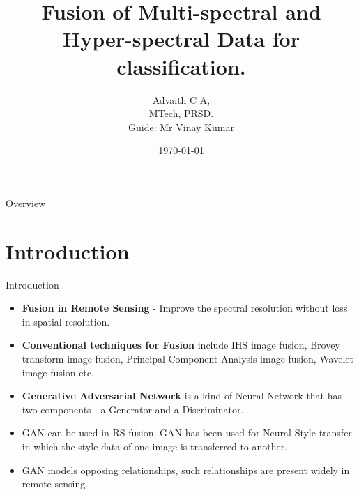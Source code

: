 \documentclass{beamer}
\title[Image Fusion using GAN]{Fusion of Multi-spectral and Hyper-spectral Data for classification.}
\author[Advaith C A]{Advaith C A,\\MTech, PRSD.\\Guide: Mr Vinay Kumar}
\date{\today}
\begin{document}
\begin{frame}
    \maketitle
\end{frame}
\begin{frame}{Overview}
    \hfill
    \parbox[t]{.89\textwidth}{
      \begin{minipage}[c][0.6\textheight]{\textwidth}
      \tableofcontents
      \end{minipage}
    }
\end{frame}
\section{Introduction}
\begin{frame}{Introduction}
    \begin{itemize}
        \item \textbf{Fusion in Remote Sensing} - Improve the spectral resolution without loss in spatial resolution.
        \item \textbf{Conventional techniques for Fusion} include IHS image fusion, Brovey transform image fusion, Principal Component Analysis image fusion, Wavelet image fusion etc.
        \item \textbf{Generative Adversarial Network} is a kind of Neural Network that has two components - a Generator and a Discriminator.
        \item GAN can be used in RS fusion. GAN has been used for Neural Style transfer in which the style data of one image is transferred to another.
        \item GAN models opposing relationships, such relationships are present widely in remote sensing.
    \end{itemize}
\end{frame}
\end{document}
